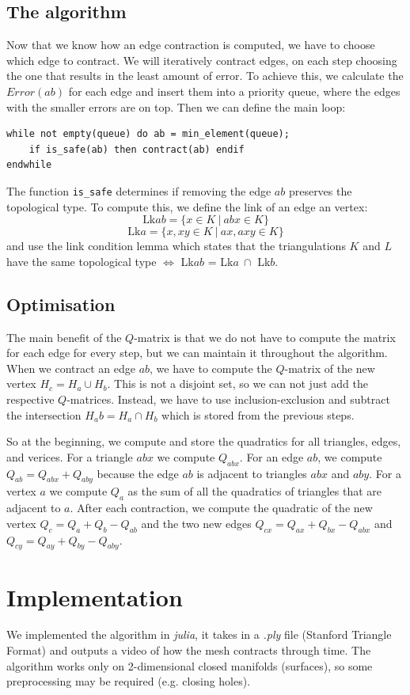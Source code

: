 \documentclass{ijclclp}
\begin{document}
\subsection{The algorithm}
Now that we know how an edge contraction is computed, we have to choose which edge to contract. We will iteratively contract edges, on each step choosing the one that results in the least amount of error. To achieve this, we calculate the $Error(ab)$ for each edge and insert them into a priority queue, where the edges with the smaller errors are on top.
Then we can define the main loop:
\begin{verbatim}
while not empty(queue) do ab = min_element(queue);
    if is_safe(ab) then contract(ab) endif
endwhile
\end{verbatim}
The function \texttt{is\_safe} determines if removing the edge $ab$ preserves the topological type. To compute this, we define the link of an edge an vertex:
\[\text{Lk} ab = \{x \in K\ |\ abx \in K\}\]
\[\text{Lk} a = \{x,xy \in K\ |\ ax,axy \in K\}\]
and use the link condition lemma which states that the triangulations $K$ and $L$ have the same topological type $\iff$ Lk$ab$ = Lk$a\ \cap$ Lk$b$.

\subsection{Optimisation}
The main benefit of the $Q$-matrix is that we do not have to compute the matrix for each edge for every step, but we can maintain it throughout the algorithm. When we contract an edge $ab$, we have to compute the $Q$-matrix of the new vertex $H_c = H_a \cup H_b$. This is not a disjoint set, so we can not just add the respective $Q$-matrices. Instead, we have to use inclusion-exclusion and subtract the intersection $H_ab = H_a \cap H_b$ which is stored from the previous steps.

So at the beginning, we compute and store the quadratics for all triangles, edges, and verices. For a triangle $abx$ we compute $Q_{abx}$. For an edge $ab$, we compute $Q_{ab} = Q_{abx} + Q_{aby}$ because the edge $ab$ is adjacent to triangles $abx$ and $aby$. For a vertex $a$ we compute $Q_a$ as the sum of all the quadratics of triangles that are adjacent to $a$.
After each contraction, we compute the quadratic of the new vertex $Q_c = Q_a + Q_b - Q_{ab}$ and the two new edges $Q_{cx} = Q_{ax} + Q_{bx} - Q_{abx}$ and $Q_{cy} = Q_{ay} + Q_{by} - Q_{aby}$.
\newpage
\section{Implementation}
We implemented the algorithm in \textit{julia}, it takes in a \textit{.ply} file (Stanford Triangle Format) and outputs a video of how the mesh contracts through time. The algorithm works only on 2-dimensional closed manifolds (surfaces), so some preprocessing may be required (e.g. closing holes).
\end{document}

